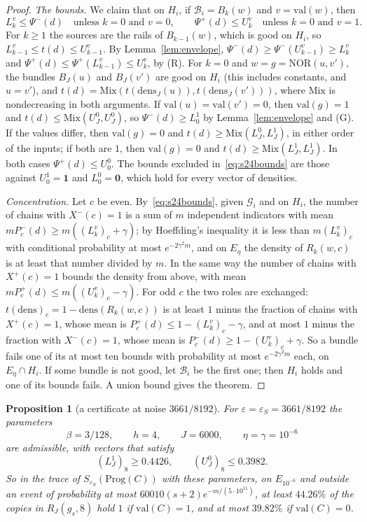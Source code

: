 \documentclass[11pt]{amsart}
\newtheorem{proposition}[theorem]{Proposition}
\theoremstyle{definition}
\theoremstyle{remark}
\newcommand{\eps}{\varepsilon}
\newcommand{\NOR}{\mathrm{NOR}}
\newcommand{\val}{\mathrm{val}}
\begin{document}
\begin{proof}
\emph{The bounds.} We claim that on $H_i$, if $\mathcal B_i=B_k(w)$ and $v=\val(w)$, then
\begin{equation}\label{eq:s24bounds}
L^v_k\le\Psi^-(d)\quad\text{unless }k=0\text{ and }v=0,\qquad
\Psi^+(d)\le U^v_k\quad\text{unless }k=0\text{ and }v=1 .
\end{equation}
For $k\ge1$ the sources are the rails of $B_{k-1}(w)$, which is good on $H_i$, so
$L^v_{k-1}\le t(d)\le U^v_{k-1}$. By Lemma~\ref{lem:envelope},
$\Psi^-(d)\ge\Psi^-(U^v_{k-1})\ge L^v_k$ and $\Psi^+(d)\le\Psi^+(L^v_{k-1})\le U^v_k$, by (R). For
$k=0$ and $w=g=\NOR(u,v')$, the bundles $B_J(u)$ and $B_J(v')$ are good on $H_i$ (this includes
constants, and $u=v'$), and $t(d)=\mathrm{Mix}(t(\mathrm{dens}_J(u)),t(\mathrm{dens}_J(v')))$, where $\mathrm{Mix}$ is
nondecreasing in both arguments. If $\val(u)=\val(v')=0$, then $\val(g)=1$ and
$t(d)\le \mathrm{Mix}(U^0_J,U^0_J)$, so $\Psi^-(d)\ge L^1_0$ by Lemma~\ref{lem:envelope} and (G). If the values
differ, then $\val(g)=0$ and $t(d)\ge \mathrm{Mix}(L^0_J,L^1_J)$, in either order of the inputs; if both are
$1$, then $\val(g)=0$ and $t(d)\ge \mathrm{Mix}(L^1_J,L^1_J)$. In both cases $\Psi^+(d)\le U^0_0$. The bounds
excluded in~\eqref{eq:s24bounds} are those against $U^1_0=\mathbf 1$ and $L^0_0=\mathbf 0$, which
hold for every vector of densities.

\emph{Concentration.} Let $c$ be even. By~\eqref{eq:s24bounds}, given $\mathcal G_i$ and on $H_i$, the
number of chains with $X^-(c)=1$ is a sum of $m$ independent indicators with mean
$mP^-_c(d)\ge m((L^v_k)_c+\gamma)$; by Hoeffding's inequality it is less than $m(L^v_k)_c$ with
conditional probability at most $e^{-2\gamma^2m}$, and on $E_\eta$ the density of $R_k(w,c)$ is at
least that number divided by $m$. In the same way the number of chains with $X^+(c)=1$ bounds the
density from above, with mean $mP^+_c(d)\le m((U^v_k)_c-\gamma)$. For odd $c$ the two roles are
exchanged: $t(\mathrm{dens})_c=1-\mathrm{dens}(R_k(w,c))$ is at least $1$ minus the fraction of
chains with $X^+(c)=1$, whose mean is $P^+_c(d)\le1-(L^v_k)_c-\gamma$, and at most $1$ minus the
fraction with $X^-(c)=1$, whose mean is $P^-_c(d)\ge1-(U^v_k)_c+\gamma$. So a bundle fails one of
its at most ten bounds with probability at most $e^{-2\gamma^2m}$ each, on $E_\eta\cap H_i$. If some
bundle is not good, let $\mathcal B_i$ be the first one; then $H_i$ holds and one of its bounds
fails. A union bound gives the theorem.
\end{proof}

\begin{proposition}[a certificate at noise $3661/8192$]\label{prop:s24cert}
For $\eps=\eps_S=3661/8192$ the parameters
\[
\beta=3/128,\qquad h=4,\qquad J=6000,\qquad \eta=\gamma=10^{-6}
\]
are admissible, with vectors that satisfy
\[
(L^1_J)_8\ge0.4426,\qquad(U^0_J)_8\le0.3982 .
\]
So in the trace of $S_{\eps_S}(\mathrm{Prog}(C))$ with these parameters, on $E_{10^{-6}}$ and outside
an event of probability at most $60010(s+2)e^{-m/(5\cdot10^{11})}$, at least $44.26\%$ of the copies
in $R_J(g_s,8)$ hold $1$ if $\val(C)=1$, and at most $39.82\%$ if $\val(C)=0$.
\end{proposition}
\end{document}

